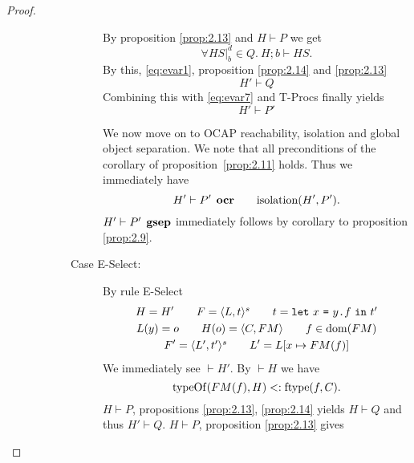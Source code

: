 \begin{proof}
\begin{description}
\begin{description}
\begin{description}
              By proposition \ref{prop:2.13} and $H \vdash P$ we get
              \begin{equation*} 
                \forall HS|_b^d \in Q. \: H; b \vdash HS.
              \end{equation*}
              By this, \eqref{eq:evar1}, proposition \ref{prop:2.14} and \ref{prop:2.13}
              \begin{equation*}
                H' \vdash Q
              \end{equation*}
              Combining this with \eqref{eq:evar7} and {\sc T-Procs} finally
              yields
              \begin{equation*}
                H' \vdash P'
              \end{equation*}

              We now move on to OCAP reachability, isolation and global object
              separation. We note that all preconditions of the corollary of
              proposition~\ref{prop:2.11} holds. Thus we immediately have 
              \begin{equation*}
                H' \vdash P' \:\: \mbox{\bf ocr} \quad\quad \mbox{$\mathrm{isolation}$}(H', P').
              \end{equation*}
              $H' \vdash P' \:\: \mbox{\bf gsep}$ immediately follows by corollary to
              proposition \ref{prop:2.9}.
            \item[Case {\sc E-Select}:] By rule {\sc E-Select}
              \begin{equation} \label{eq:eselect1}
                \begin{gathered}
                  H = H' \quad\quad F = \mbox{$\langle L, t \rangle^s$} \quad\quad t =
                  \mbox{\texttt{let}~$x$~\texttt{=}~$\mbox{$y$\texttt{.}$f$}$~\texttt{in}~$t'$} \\
                  L(y) = o \quad\quad H(o) = \mbox{$\langle C, FM \rangle$} \quad\quad f \in \mbox{$\mathrm{dom}$}(FM)
                  \\
                  F' = \mbox{$\langle L', t' \rangle^s$} \quad\quad L' = L[x \mapsto FM(f)]
                \end{gathered}
              \end{equation}
              We immediately see $\vdash H'$. By $\vdash H$ we have
              \begin{equation} \label{eq:eselect2}
                \mbox{$\mathrm{typeOf}$}(FM(f), H) <: \mbox{$\mathrm{ftype}$}(f, C).
              \end{equation}
              $H \vdash P$, propositions \ref{prop:2.13}, \ref{prop:2.14} yields
              $H \vdash Q$ and thus $H' \vdash Q$.
              $H \vdash P$, proposition \ref{prop:2.13} gives 

\end{description}
\end{description}
\end{description}
\end{proof}
